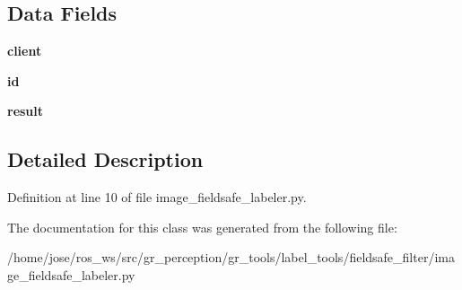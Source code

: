 \subsection*{Data Fields}
\begin{DoxyCompactItemize}
\item 
\mbox{\label{classimage__fieldsafe__labeler_1_1ImageFieldSafeLabeler_a79d860b0faea4357d2c05de82523fba2}} 
{\bfseries client}
\item 
\mbox{\label{classimage__fieldsafe__labeler_1_1ImageFieldSafeLabeler_aff55041af35cac2ca4cd47c98477c915}} 
{\bfseries id}
\item 
\mbox{\label{classimage__fieldsafe__labeler_1_1ImageFieldSafeLabeler_aa73d8612cbd9cce72cdef931f63f9080}} 
{\bfseries result}
\end{DoxyCompactItemize}


\subsection{Detailed Description}


Definition at line 10 of file image\+\_\+fieldsafe\+\_\+labeler.\+py.



The documentation for this class was generated from the following file\+:\begin{DoxyCompactItemize}
\item 
/home/jose/ros\+\_\+ws/src/gr\+\_\+perception/gr\+\_\+tools/label\+\_\+tools/fieldsafe\+\_\+filter/image\+\_\+fieldsafe\+\_\+labeler.\+py\end{DoxyCompactItemize}
